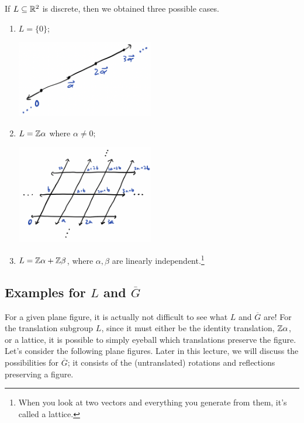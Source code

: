 If $L \subseteq \mathbb R^2$ is discrete, then we obtained three possible cases. 
\begin{enumerate}[label = (\roman*)]
    \item $L = \{0\}$;
        \begin{center}
    \includegraphics[width=6cm]{Lecture Files and Images/lec16-line.png}
\end{center}
    \item $L = \mathbb Z \alpha$ where $\alpha \neq 0;$
    \begin{center}
    \includegraphics[width=6cm]{Lecture Files and Images/lec15-lattice.png}
\end{center}

    \item $L = \mathbb Z\alpha + \mathbb Z\beta$, where $\alpha, \beta$ are linearly independent.\footnote{When you look at two vectors and everything you generate from them, it's called a lattice.}%
    

\end{enumerate}

\subsection{Examples for \texorpdfstring{$L$}{L} and \texorpdfstring{$\overline{G}$}{G}}\label{examples for l and g}

For a given plane figure, it is actually not difficult to see what $L$ and $\overline{G}$ are! For the translation subgroup $L$, since it must either be the identity translation, $\mathbb Z\alpha$, or a lattice, it is possible to simply eyeball which translations preserve the figure. Let's consider the following plane figures. Later in this lecture, we will discuss the possibilities for $\overline{G}$; it consists of the (untranslated) rotations and reflections preserving a figure.




